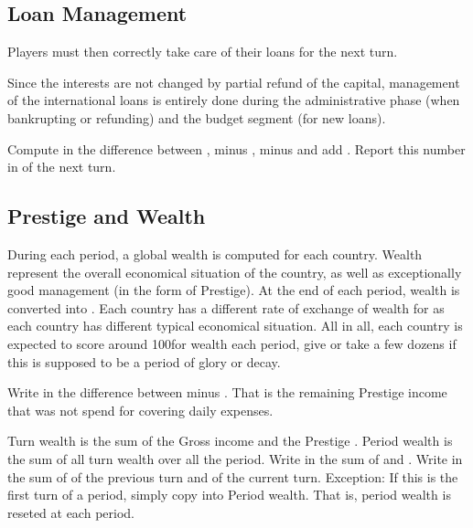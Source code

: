 \subsection{Loan Management}
\aparag Players must then correctly take care of their loans for the next
turn.

\bparag Since the interests are not changed by partial refund of the capital,
management of the international loans is entirely done during the
administrative phase (when bankrupting or refunding) and the budget segment
(for new loans).

\bparag Compute in  the difference between
, minus , minus  and add
.
\bparag Report this number in  of the
next turn.

\subsection{Prestige and Wealth}\label{chBudget:Prestige and Wealth}
\aparag[Wealth] During each period, a global wealth is computed for each
country. Wealth represent the overall economical situation of the country, as
well as exceptionally good management (in the form of Prestige).
\bparag At the end of each period, wealth is converted into \VPs. Each country
has a different rate of exchange of wealth for \VPs as each country has
different typical economical situation.
\bparag All in all, each country is expected to score around 100\VPs for
wealth each period, give or take a few dozens if this is supposed to be a
period of glory or decay.

\aparag[Prestige] Write in  the difference between
 minus . That
is the remaining Prestige income that was not spend for covering daily
expenses.

\aparag[Wealth] Turn wealth is the sum of the Gross income and the Prestige
\VPs. Period wealth is the sum of all turn wealth over all the period.
\bparag Write in  the sum of 
and .
\bparag Write in  the sum of  of the previous turn and  of the current turn.
\bparag Exception: If this is the first turn of a period, simply copy
 into {Period wealth}. That is, period wealth is reseted
at each period.

